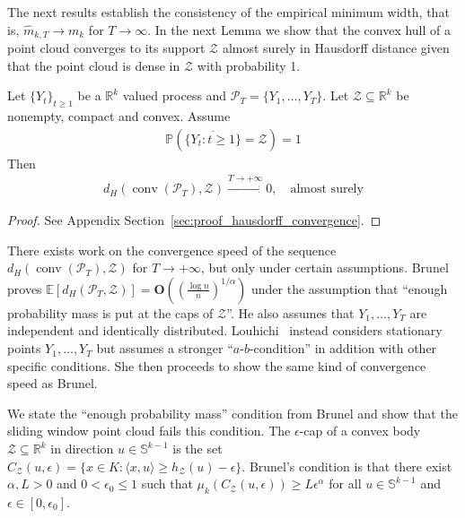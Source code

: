 The next results establish the consistency of the empirical minimum width, that is, $\hat{m}_{k,T}\to m_k$ for $T\to\infty$. In the next Lemma we show that the convex hull of a point cloud converges to its support $\mathcal{Z}$ almost surely in Hausdorff distance given that the point cloud is dense in $\mathcal{Z}$ with probability 1.

\begin{Lem}\label{lem:hausdorff_convergence}
    Let $\{Y_t\}_{t\ge1}$ be a $\mathbb{R}^{k}$ valued process and $\mathcal{P}_T=\{Y_1,\dots,Y_T\}$. Let $\mathcal{Z}\subseteq\mathbb{R}^{k}$ be nonempty, compact and convex. Assume
    \begin{align*}
        \mathbb{P}\left(\overline{\{Y_t:t\ge1\}}=\mathcal{Z}\right)=1
    \end{align*}
    Then
    \begin{align*}
        d_H(\operatorname{conv}(\mathcal{P}_T),\mathcal{Z})\stackrel{T\to+\infty}{\to}0,\quad\text{almost surely}
    \end{align*}
\end{Lem}

\begin{proof}
    See Appendix Section~\ref{sec:proof_hausdorff_convergence}.
\end{proof}

There exists work on the convergence speed of the sequence $d_H(\operatorname{conv}(\mathcal{P}_T),\mathcal{Z})$ for $T\to+\infty$, but only under certain assumptions. Brunel~\cite{brunel_uniform_2019} proves $\mathbb{E}[d_H(\mathcal{P}_T,\mathcal{Z})]=\mathbf{O}((\frac{\log{n}}{n})^{1/\alpha})$ under the assumption that \enquote{enough probability mass is put at the caps of $\mathcal{Z}$}. He also assumes that $Y_1,\dots,Y_T$ are independent and identically distributed. Louhichi~\cite{louhichi_sharp_2025} instead considers stationary points $Y_1,\dots,Y_T$ but assumes a stronger \enquote{$a$-$b$-condition} in addition with other specific conditions. She then proceeds to show the same kind of convergence speed as Brunel.

We state the \enquote{enough probability mass} condition from Brunel and show that the sliding window point cloud fails this condition. The $\epsilon$-cap of a convex body $\mathcal{Z}\subseteq\mathbb{R}^k$ in direction $u\in\mathbb{S}^{k-1}$ is the set $C_{\mathcal{Z}}(u,\epsilon)=\{x\in K:\langle x,u\rangle\ge h_{\mathcal{Z}}(u)-\epsilon\}$. Brunel's condition is that there exist $\alpha,L>0$ and $0<\epsilon_0\le1$ such that $\mu_k(C_{\mathcal{Z}}(u,\epsilon))\ge L\epsilon^{\alpha}$ for all $u\in\mathbb{S}^{k-1}$ and $\epsilon\in[0,\epsilon_0]$.

